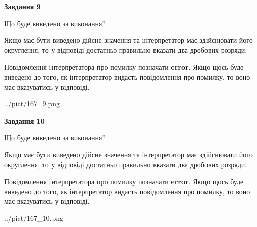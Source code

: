 \documentclass[12pt, ukrainian]{article}
\begin{document}
{\begin {Large}
{\begin {center}\textbf{Завдання 9}\end {center}}\par
Що буде виведено за виконання? \par

Якщо має бути виведено дійсне значення та інтерпретатор має здійснювати його округлення, 
то у відповіді достатньо правильно вказати два дробових розряди.

Повідомлення інтерпретатора про помилку позначати \textbf{error}.
Якщо щось буде виведено до того, як інтерпретатор видасть повідомлення про помилку, 
то воно має вказуватись у відповіді. \par

\begin{center}
	{../pict/167_9.png}
\end{center}
\newpage

{\begin {center}\textbf{Завдання 10}\end {center}}\par
Що буде виведено за виконання? \par

Якщо має бути виведено дійсне значення та інтерпретатор має здійснювати його округлення, 
то у відповіді достатньо правильно вказати два дробових розряди.

Повідомлення інтерпретатора про помилку позначати \textbf{error}.
Якщо щось буде виведено до того, як інтерпретатор видасть повідомлення про помилку, 
то воно має вказуватись у відповіді. \par

\begin{center}
	{../pict/167_10.png}
\end{center}
\newpage

\end {Large}}
\end{document}
